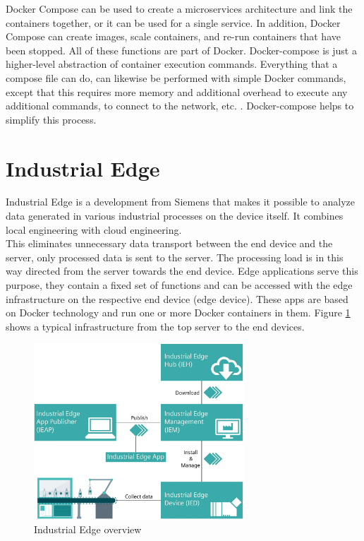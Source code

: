 		Docker Compose can be used to create a microservices architecture and link the containers together, or it can be used for a single service. In addition, Docker Compose can create images, scale containers, and re-run containers that have been stopped. All of these functions are part of Docker. Docker-compose is just a higher-level abstraction of container execution commands. Everything that a compose file can do, can likewise be performed with simple Docker commands, except that this requires more memory and additional overhead to execute any additional commands, to connect to the network, etc. . Docker-compose helps to simplify this process.
				
	\section{Industrial Edge}
	\label{Grundlagen:IndustrialEdge}
		
	Industrial Edge is a development from Siemens that makes it possible to analyze data generated in various industrial processes on the device itself. It combines local engineering with cloud engineering.\cite{siemensIndustrialEdge}\\

	This eliminates unnecessary data transport between the end device and the server, only processed data is sent to the server. The processing load is in this way directed from the server towards the end device. Edge applications serve this purpose, they contain a fixed set of functions and can be accessed with the edge infrastructure on the respective end device (edge device). These apps are based on Docker technology and run one or more Docker containers in them. Figure \ref{fig:Grundlagen:IndustrialEdge:Ueberblick} shows a typical infrastructure from the top server to the end devices.

		\begin{figure}[h]
			\centering
			\includegraphics[width=0.70\textwidth]{"Bilder/Edge_uebersicht.jpg"}
			\caption{Industrial Edge overview \cite{siemensIEM_gettingStarted}}
			\label{fig:Grundlagen:IndustrialEdge:Ueberblick}					
		\end{figure}
	
